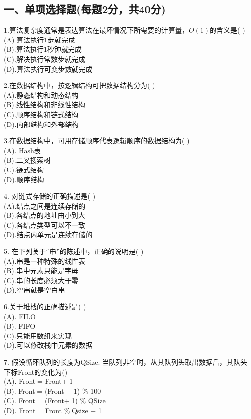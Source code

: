 
\subsection{一、单项选择题(每题2分，共40分)}

1.算法复杂度通常是表达算法在最坏情况下所需要的计算量，$O(1)$的含义是( ) \\
(A).算法执行1步就完成 \\
(B).算法执行1秒钟就完成 \\
(C).解决执行常数步就完成 \\
(D).算法执行可变步数就完成

2.在数据结构中，按逻辑结构可把数据结构分为( ) \\
(A).静态结构和动态结构 \\
(B).线性结构和非线性结构 \\
(C).顺序结构和链式结构 \\
(D).内部结构和外部结构

3.在数据结构中，可用存储顺序代表逻辑顺序的数据结构为( ) \\
(A). Hash表 \\
(B).二叉搜索树 \\
(C).链式结构 \\
(D).顺序结构

4. 对链式存储的正确描述是( ) \\
(A).结点之间是连续存储的 \\
(B).各结点的地址由小到大 \\
(C).各结点类型可以不一致 \\
(D).结点内单元是连续存储的

5. 在下列关于“串”的陈述中，正确的说明是( ) \\
(A).串是一种特殊的线性表 \\
(B).串中元素只能是字母 \\
(C).串的长度必须大于零 \\
(D).空串就是空白串

6.关于堆栈的正确描述是( ) \\
(A). FILO \\
(B). FIFO \\
(C).只能用数组来实现 \\
(D).可以修改栈中元素的数据

7. 假设循环队列的长度为QSize. 当队列非空时，从其队列头取出数据后，其队头下标Front的变化为() \\
(A). Front = Front+ 1 \\
(B). Front = (Front + 1) \% 100 \\
(C). Front = (Front+ 1) \% QSize \\
(D). Front = Front \% Qsize + 1

